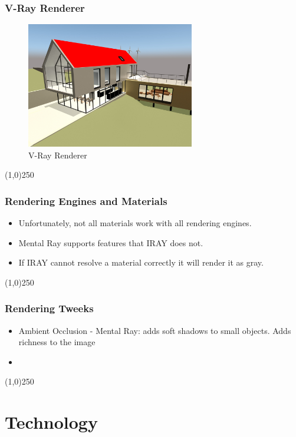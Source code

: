 \begin{frame}
\frametitle{V-Ray Renderer}
\begin{figure}
	\centering
	\includegraphics[height=5.5cm]{img/Rendering/VRay.jpg}
	\caption{V-Ray Renderer}
	\label{fig:V-RayRenderer}
\end{figure}
\end{frame}
\begin{center}\line(1,0){250}\end{center}




\begin{frame}
\frametitle{Rendering Engines and Materials}
\begin{itemize}
	\item Unfortunately, not all materials work with all rendering engines.
	\item Mental Ray supports features that IRAY does not.
	\item If IRAY cannot resolve a material correctly it will render it as gray.
\end{itemize}
\end{frame}
\begin{center}\line(1,0){250}\end{center}


\begin{frame}
\frametitle{Rendering Tweeks}
\begin{itemize}
	\item Ambient Occlusion - Mental Ray: adds soft shadows to small objects.  Adds richness to the image
	\item 
\end{itemize}
\end{frame}
\begin{center}\line(1,0){250}\end{center}





\section{Technology}



